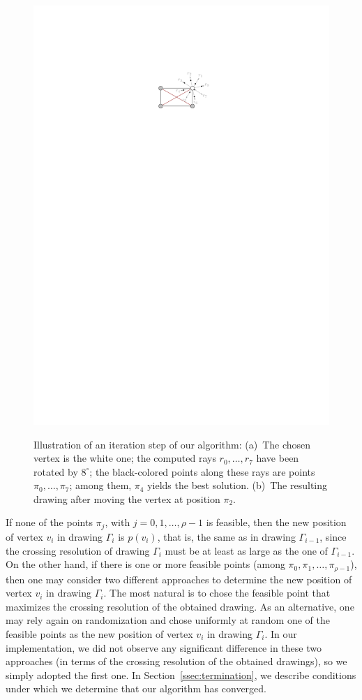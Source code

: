 \documentclass[runningheads]{llncs}
\begin{document}
\begin{figure}[t!]
{	\includegraphics[page=2]{figures/algorithm}}
	\caption{%
	Illustration of an iteration step of our algorithm: 
	(a)~The chosen vertex is the white one; 
	the computed rays $r_0,\ldots,r_7$ have been rotated by $8^\circ$; 
	the black-colored points along these rays are points $\pi_0,\ldots,\pi_7$; 
	among them, $\pi_4$ yields the best solution.
	(b)~The resulting drawing after moving the vertex at position $\pi_2$.}
	\label{fig:algo}
\end{figure} 

If none of the points $\pi_j$, with $j=0,1,\ldots,\rho-1$ is feasible, then the new position of vertex $v_i$ in drawing $\Gamma_i$ is $p(v_i)$, that is, the same as in drawing $\Gamma_{i-1}$, since the crossing resolution of drawing $\Gamma_i$ must be at least as large as the one of $\Gamma_{i-1}$. On the other hand, if there is one or more feasible points (among $\pi_0,\pi_1,\ldots,\pi_{\rho-1}$), then one may consider two different approaches to determine the new position of vertex $v_i$ in drawing $\Gamma_i$. The most natural is to chose the feasible point that maximizes the crossing resolution of the obtained drawing. As an alternative, one may rely again on randomization and chose uniformly at random one of the feasible points as the new position of vertex $v_i$ in drawing $\Gamma_i$. In our implementation, we did not observe any significant difference in these two approaches (in terms of the crossing resolution of the obtained drawings), so we simply adopted the first one. In Section~\ref{ssec:termination}, we describe conditions under which we determine that our algorithm has converged.
\end{document}
